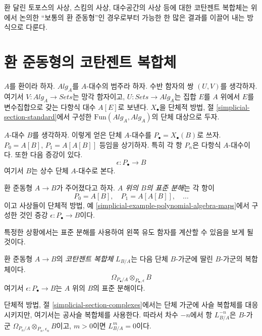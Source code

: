 \medskip\noindent
환 달린 토포스의 사상, 스킴의 사상, 대수공간의 사상 등에 대한 코탄젠트
복합체는 위에서 논의한 ``보통의 환 준동형''인 경우로부터 가능한 한 많은
결과를 이끌어 내는 방식으로 다룬다.





\section{환 준동형의 코탄젠트 복합체}
\label{section-cotangent-ring-map}

\noindent
$A$를 환이라 하자. $\textit{Alg}_A$를 $A$-대수의 범주라 하자. 수반
함자의 쌍 $(U,V)$를 생각하자. 여기서
$V:\textit{Alg}_A\to\textit{Sets}$는 망각 함자이고,
$U:\textit{Sets}\to\textit{Alg}_A$는 집합 $E$를 $A$ 위에서 $E$를
변수집합으로 갖는 다항식 대수 $A[E]$로 보낸다. $X_\bullet$을 단체적
방법, 절 \ref{simplicial-section-standard}에서 구성한
$\text{Fun}(\textit{Alg}_A,\textit{Alg}_A)$의 단체 대상으로 두자.

\medskip\noindent
$A$-대수 $B$를 생각하자. 이렇게 얻은 단체 $A$-대수를
$P_\bullet=X_\bullet(B)$로 쓰자. $P_0=A[B]$, $P_1=A[A[B]]$ 등임을
상기하자. 특히 각 항 $P_n$은 다항식 $A$-대수이다. 또한 다음 증강이 있다.
$$
\epsilon : P_\bullet \longrightarrow B
$$
여기서 $B$는 상수 단체 $A$-대수로 본다.

\begin{definition}
\label{definition-standard-resolution}
환 준동형 $A\to B$가 주어졌다고 하자. {\it $A$ 위의 $B$의 표준 분해}는
각 항이
$$
P_0 = A[B],\quad P_1 = A[A[B]],\quad \ldots
$$
이고 사상들이 단체적 방법, 예
\ref{simplicial-example-polynomial-algebra-maps}에서 구성한 것인 증강
$\epsilon:P_\bullet\to B$이다.
\end{definition}

\noindent
특정한 상황에서는 표준 분해를 사용하여 왼쪽 유도 함자를 계산할 수 있음을
보게 될 것이다.

\begin{definition}
\label{definition-cotangent-complex-ring-map}
환 준동형 $A\to B$의 {\it 코탄젠트 복합체} $L_{B/A}$는 다음 단체
$B$-가군에 딸린 $B$-가군의 복합체이다.
$$
\Omega_{P_\bullet/A} \otimes_{P_\bullet, \epsilon} B
$$
여기서 $\epsilon:P_\bullet\to B$는 $A$ 위의 $B$의 표준 분해이다.
\end{definition}

\noindent
단체적 방법, 절 \ref{simplicial-section-complexes}에서는 단체 가군에
사슬 복합체를 대응시키지만, 여기서는 공사슬 복합체를 사용한다. 따라서
차수 $-n$에서 항 $L_{B/A}^{-n}$은 $B$-가군
$\Omega_{P_n/A}\otimes_{P_n,\epsilon_n}B$이고, $m>0$이면
$L_{B/A}^m=0$이다.

